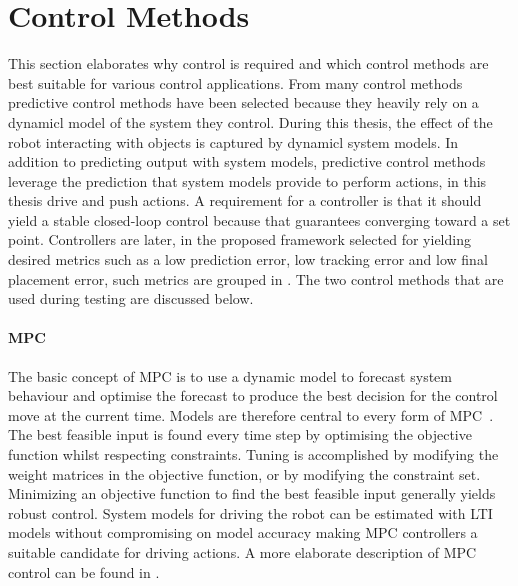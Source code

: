 \section{Control Methods}%
\label{sec:control_methods}
This section elaborates why control is required and which control methods are best suitable for various control applications. From many control methods predictive control methods have been selected because they heavily rely on a dynamicl model of the system they control. During this thesis, the effect of the robot interacting with objects is captured by dynamicl system models. In addition to predicting output with system models, predictive control methods leverage the prediction that system models provide to perform actions, in this thesis drive and push actions. A requirement for a controller is that it should yield a stable closed-loop control because that guarantees converging toward a set point. Controllers are later, in the proposed framework selected for yielding desired metrics such as a low prediction error, low tracking error and low final placement error, such metrics are grouped in . The two control methods that are used during testing are discussed below.\bs

\paragraph{\acl{MPC}}
The basic concept of \ac{MPC} is to use a dynamic model to forecast system behaviour and optimise the forecast to produce the best decision for the control move at the current time. Models are therefore central to every form of \ac{MPC}~\cite{rawlings_model_2020}. The best feasible input is found every time step by optimising the objective function whilst respecting constraints. Tuning is accomplished by modifying the weight matrices in the objective function, or by modifying the constraint set. Minimizing an objective function to find the best feasible input generally yields robust control. System models for driving the robot can be estimated with \ac{LTI} models without compromising on model accuracy making \ac{MPC} controllers a suitable candidate for driving actions. A more elaborate description of \ac{MPC} control can be found in .\bs


